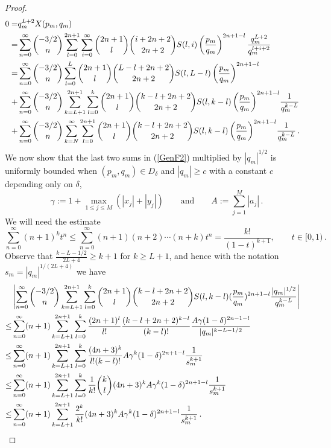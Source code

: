 \documentclass{article}
\theoremstyle{remark}
\numberwithin{equation}{section}
\begin{document}
\begin{proof}
\begin{equation}\label{GenF2} \begin{split}
0 = &  q_m^{L+2} X(p_m,q_m) \cr 
= & \sum_{n=0}^\infty \binom{-3/2}{n} \sum_{l=0}^{2n+1} \sum_{i=0}^\infty \binom{2n+1}{l} \binom{i+2n+2}{2n+2}  S(l,i) \left( \frac{p_m}{q_m} \right)^{2n+1-l} \frac{q_m^{L+2}}{q_m^{l+i+2}} \cr
= & \sum_{n=0}^\infty{\binom{-3/2}{n} \sum_{l=0}^L \binom{2n+1}{l} \binom{L-l+2n+2}{2n+2} S(l,L-l) \left( \frac{p_m}{q_m} \right)^{2n+1-l}} \cr 
+ & \sum_{n=0}^\infty{\binom{-3/2}{n} \sum_{k=L+1}^{2n+1}\sum_{l=0}^k \binom{2n+1}{l} \binom{k-l+2n+2}{2n+2} 
S(l,k-l) \left( \frac{p_m}{q_m} \right)^{2n+1-l}} \frac{1}{q_m^{k-L}} \cr
+ &  \sum_{n=0}^\infty{\binom{-3/2}{n} \sum_{k=N}^{\infty}\sum_{l=0}^{2n+1} \binom{2n+1}{l} \binom{k-l+2n+2}{2n+2} S(l,k-l) \left( \frac{p_m}{q_m} \right)^{2n+1-l}} \frac{1}{q_m^{k-L}}\,. \cr
\end{split} \end{equation}
We now show that the last two sums in (\ref{GenF2}) multiplied by $|q_m|^{1/2}$ is uniformly bounded when $(p_m,q_m) \in D_{\delta}$ and $|q_m| \geq c$ 
with a constant $c$ depending only on $\delta$, 
$$\gamma := 1 + \max_{1 \leq j \leq M}{(|x_j| + |y_j|)} \qquad \text{and} \qquad A := \sum\limits_{j=1}^M |a_j|\,.$$
We will need the estimate
\begin{equation} \label{GenF3} 
\sum_{n=0}^\infty{(n+1)^kt^n} \leq \sum_{n=0}^\infty{(n+1)(n+2) \cdots (n+k)t^n} = \frac{k!}{(1-t)^{k+1}}, \qquad t \in [0,1)\,.
\end{equation}
Observe that $\displaystyle{\frac{k-L-1/2}{2L+4} \geq k+1}$ for $k \geq L+1$, and hence with the notation $s_m = \left|q_m\right|^{1/(2L+4)}$  we have 
\begin{equation}\label{GenF4}\begin{split}
& \left| \sum_{n=0}^\infty \binom{-3/2}{n} \sum_{k=L+1}^{2n+1} \sum_{l=0}^k \binom{2n+1}{l} \binom{k-l+2n+2}{2n+2} 
S(l,k-l) ( \frac{p_m}{q_m} )^{2n+1-l} \frac{|q_m|^{1/2}}{q_m^{k-L}} \right| \cr
\leq  & \sum_{n=0}^\infty (n+1) \sum_{k=L+1}^{2n+1} \sum_{l=0}^k{\frac{(2n+1)^{l}}{l!} \frac{(k-l+2n+2)^{k-l}}{(k-l)!}} \frac{A\gamma(1-\delta)^{2n-1-l}}{|q_m|^{k-L-1/2}} \cr
\leq  & \sum_{n=0}^\infty (n+1) \sum_{k=L+1}^{2n+1} \sum_{l=0}^k{\frac{(4n+3)^k}{l!(k-l)!} A\gamma^k (1-\delta)^{2n+1-l}} \frac{1}{s_m^{k+1}} \cr
\leq  & \sum_{n=0}^\infty (n+1) \sum_{k=L+1}^{2n+1} \sum_{l=0}^k{\frac{1}{k!} \binom{k}{l} (4n+3)^k A\gamma^k (1-\delta)^{2n+1-l}} \frac{1}{s_m^{k+1}} \cr
\leq  & \sum_{n=0}^\infty (n+1) \sum_{k=L+1}^{2n+1} \frac{2^k}{k!} (4n+3)^k A\gamma^k (1-\delta)^{2n+1-l} \frac{1}{s_m^{k+1}}\,. \cr

\end{split}
\end{equation}
\end{proof}
\end{document}
